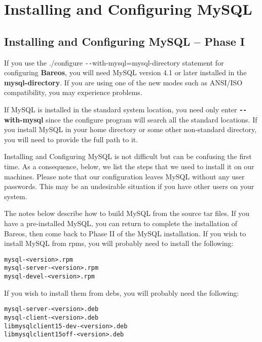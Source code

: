 
\chapter{Installing and Configuring MySQL}
\label{MySqlChapter}

\section{Installing and Configuring MySQL -- Phase I}

If you use the ./configure \verb:--:with-mysql=mysql-directory statement for
configuring {\bf Bareos}, you will need MySQL version 4.1 or later installed
in the {\bf mysql-directory}.  If you are using one of the new modes such as
ANSI/ISO compatibility, you may experience problems.

If MySQL is installed in the standard system location, you need only enter
{\bf \verb:--:with-mysql} since the configure program will search all the
standard locations.  If you install MySQL in your home directory or some
other non-standard directory, you will need to provide the full path to it.

Installing and Configuring MySQL is not difficult but can be confusing the
first time. As a consequence, below, we list the steps that we used to install
it on our machines. Please note that our configuration leaves MySQL without
any user passwords. This may be an undesirable situation if you have other
users on your system.

The notes below describe how to build MySQL from the source tar files. If
you have a pre-installed MySQL, you can return to complete the installation
of Bareos, then come back to Phase II of the MySQL installation.  If you
wish to install MySQL from rpms, you will probably need to install
the following:

\footnotesize
\begin{verbatim}
mysql-<version>.rpm
mysql-server-<version>.rpm
mysql-devel-<version>.rpm
\end{verbatim}
\normalsize

If you wish to install them from debs, you will probably need the
following:

\footnotesize
\begin{verbatim}
mysql-server-<version>.deb
mysql-client-<version>.deb
libmysqlclient15-dev-<version>.deb
libmysqlclient15off-<version>.deb
\end{verbatim}
\normalsize

